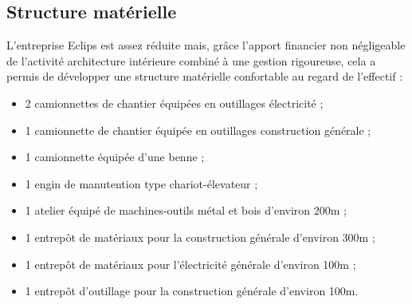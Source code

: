 \documentclass[a4paper, 12pt]{article}
\begin{document}
  \begin{center}
 	\end{center}

\subsection{Structure matérielle}

L'entreprise Eclips est assez réduite mais, grâce l'apport financier non négligeable de l'activité architecture intérieure combiné à une gestion rigoureuse, cela a permis de développer une structure matérielle confortable au regard de l'effectif : 

\begin{itemize}
        
        \item 2 camionnettes de chantier équipées en outillages électricité ;
        \item 1 camionnette de chantier équipée en outillages construction générale ;
        \item 1 camionnette équipée d'une benne ;
        \item 1 engin de manutention type chariot-élevateur ;
        \item 1 atelier équipé de machines-outils métal et bois d'environ 200m ;
        \item 1 entrepôt de matériaux pour la construction générale d'environ 300m ;
        \item 1 entrepôt de matériaux pour l'électricité générale d'environ 100m ;
        \item 1 entrepôt d'outillage pour la construction générale d'environ 100m.

    \end{itemize}        
\end{document}
